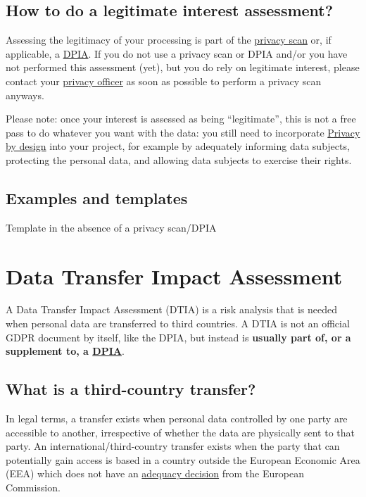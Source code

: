 \documentclass[
]{book}
\begin{document}
\hypertarget{lia-how}{%
\subsection{How to do a legitimate interest assessment?}\label{lia-how}}

Assessing the legitimacy of your processing is part of the
\protect\hyperlink{privacy-scan}{privacy scan} or, if applicable, a \protect\hyperlink{dpia}{DPIA}. If you do not
use a privacy scan or DPIA and/or you have not performed this assessment (yet),
but you do rely on legitimate interest, please contact your
\protect\hyperlink{support}{privacy officer} as soon as possible to perform a privacy scan anyways.

Please note: once your interest is assessed as being ``legitimate'', this is not
a free pass to do whatever you want with the data: you still need to incorporate
\protect\hyperlink{privacy-by-design}{Privacy by design} into your project, for example by
adequately informing data subjects, protecting the personal data, and allowing
data subjects to exercise their rights.

\hypertarget{examples-and-templates-3}{%
\subsection{Examples and templates}\label{examples-and-templates-3}}

Template in the absence of a privacy scan/DPIA

\hypertarget{dtia}{%
\section{Data Transfer Impact Assessment}\label{dtia}}

A Data Transfer Impact Assessment (DTIA) is a risk analysis that is needed when
personal data are transferred to third countries. A DTIA is not an official
GDPR document by itself, like the DPIA, but instead is \textbf{usually part of, or a
supplement to, a \protect\hyperlink{dpia}{DPIA}}.

\hypertarget{third-country-transfer}{%
\subsection{What is a third-country transfer?}\label{third-country-transfer}}

In legal terms, a transfer exists when personal data controlled by one party
are accessible to another, irrespective of whether the data are physically sent
to that party. An international/third-country transfer exists when the party
that can potentially gain access is based in a country outside the European
Economic Area (EEA) which does not have an
\href{https://ec.europa.eu/info/law/law-topic/data-protection/international-dimension-data-protection/adequacy-decisions_en}{adequacy decision}
from the European Commission.
\end{document}

